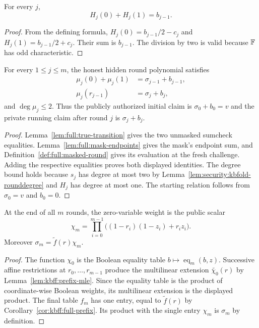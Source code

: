 \begin{lemma}\label{lem:full:mask-endpoints}
For every $j$,
\[
 \boxed{H_j(0)+H_j(1)=b_{j-1}.}
\]
\end{lemma}
\begin{proof}
From the defining formula,
$H_j(0)=b_{j-1}/2-c_j$ and
$H_j(1)=b_{j-1}/2+c_j$.
Their sum is $b_{j-1}$.
The division by two is valid
because $\mathbb{F}$ has odd characteristic.
\end{proof}

\begin{theorem}\label{thm:full:masked-sumcheck}
For every $1\le j\le m$, the
honest hidden round polynomial satisfies
\[
 \boxed{
 \begin{aligned}
 \mu_j(0)+\mu_j(1)&=\sigma_{j-1}+b_{j-1},\\
 \mu_j(r_{j-1})&=\sigma_j+b_j,
 \end{aligned}}
\]
and $\deg\mu_j\le2$.
Thus the publicly authorized
initial claim is
$\sigma_0+b_0=v$ and the
private running claim after
round $j$ is $\sigma_j+b_j$.
\end{theorem}
\begin{proof}
Lemma~\ref{lem:full:true-transition}
gives the two unmasked sumcheck
equalities. Lemma~\ref{lem:full:mask-endpoints}
gives the mask's endpoint sum,
and Definition~\ref{def:full:masked-round}
gives its evaluation at the
fresh challenge. Adding the
respective equalities proves
both displayed identities.
The degree bound holds because
$s_j$ has degree at most two
by Lemma~\ref{lem:security:kbfold-rounddegree}
and $H_j$ has degree at most one.
The starting relation follows
from $\sigma_0=v$ and $b_0=0$.
\end{proof}

\begin{lemma}\label{lem:full:final-chi}
At the end of all $m$ rounds,
the zero-variable weight is
the public scalar
\[
 \boxed{
 \chi_m=\prod_{i=0}^{m-1}
 \bigl((1-r_i)(1-z_i)+r_iz_i\bigr).
 }
\]
Moreover
$\sigma_m=\widetilde f(r)\chi_m$.
\end{lemma}
\begin{proof}
The function $\chi_0$ is the
Boolean equality table
$b\mapsto\operatorname{eq}_m(b,z)$.
Successive affine restrictions
at $r_0,\ldots,r_{m-1}$
produce the multilinear extension
$\widetilde{\chi_0}(r)$ by
Lemma~\ref{lem:kbff:prefix-mle}.
Since the equality table is the
product of coordinate-wise
Boolean weights, its
multilinear extension is the
displayed product.
The final table $f_m$ has
one entry, equal to
$\widetilde f(r)$ by
Corollary~\ref{cor:kbff:full-prefix}.
Its product with the single
entry $\chi_m$ is
$\sigma_m$ by definition.
\end{proof}

